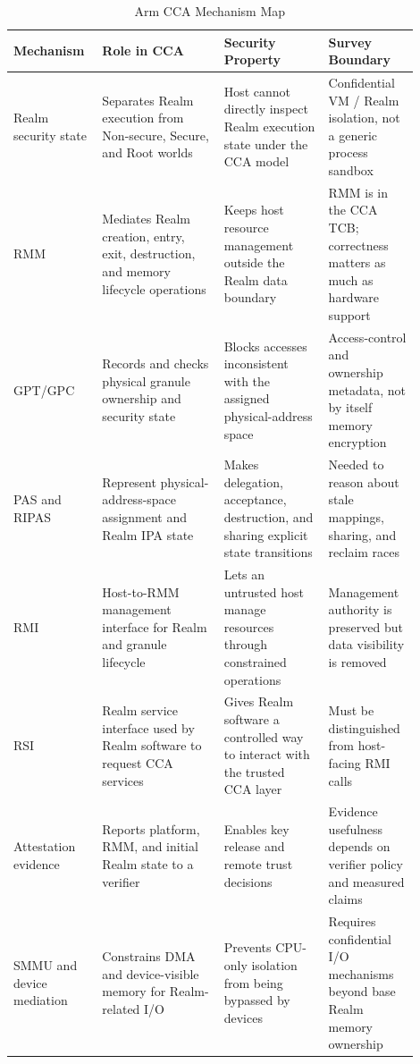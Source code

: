 \begin{table}[t]
\centering
\caption{Arm CCA Mechanism Map}
\label{tab:arm_cca_mechanism_map}
\begin{tabular}{@{}p{0.18\linewidth}p{0.28\linewidth}p{0.24\linewidth}p{0.20\linewidth}@{}}
\toprule
\textbf{Mechanism} & \textbf{Role in CCA} & \textbf{Security Property} & \textbf{Survey Boundary} \\ \midrule
Realm security state & Separates Realm execution from Non-secure, Secure, and Root worlds & Host cannot directly inspect Realm execution state under the CCA model & Confidential VM / Realm isolation, not a generic process sandbox \\
RMM & Mediates Realm creation, entry, exit, destruction, and memory lifecycle operations & Keeps host resource management outside the Realm data boundary & RMM is in the CCA TCB; correctness matters as much as hardware support \\
GPT/GPC & Records and checks physical granule ownership and security state & Blocks accesses inconsistent with the assigned physical-address space & Access-control and ownership metadata, not by itself memory encryption \\
PAS and RIPAS & Represent physical-address-space assignment and Realm IPA state & Makes delegation, acceptance, destruction, and sharing explicit state transitions & Needed to reason about stale mappings, sharing, and reclaim races \\
RMI & Host-to-RMM management interface for Realm and granule lifecycle & Lets an untrusted host manage resources through constrained operations & Management authority is preserved but data visibility is removed \\
RSI & Realm service interface used by Realm software to request CCA services & Gives Realm software a controlled way to interact with the trusted CCA layer & Must be distinguished from host-facing RMI calls \\
Attestation evidence & Reports platform, RMM, and initial Realm state to a verifier & Enables key release and remote trust decisions & Evidence usefulness depends on verifier policy and measured claims \\
SMMU and device mediation & Constrains DMA and device-visible memory for Realm-related I/O & Prevents CPU-only isolation from being bypassed by devices & Requires confidential I/O mechanisms beyond base Realm memory ownership \\ \bottomrule
\end{tabular}
\end{table}

